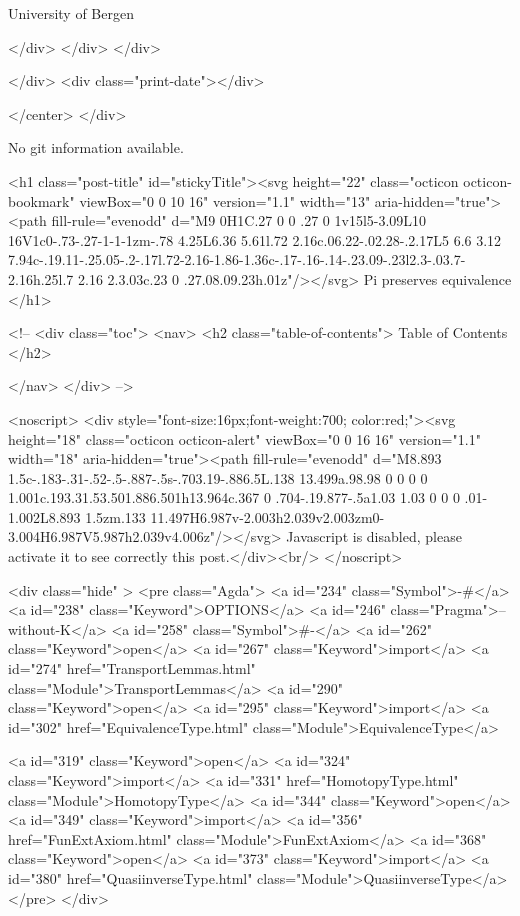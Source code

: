                   University of Bergen
                
                </div>
            </div>
          </div>
          
          
        </div>
        <div class="print-date"></div>
        
        
    </center>
  </div>

  
  No git information available.
  
  <h1 class="post-title" id="stickyTitle"><svg height="22" class="octicon octicon-bookmark" viewBox="0 0 10 16" version="1.1" width="13" aria-hidden="true"><path fill-rule="evenodd" d="M9 0H1C.27 0 0 .27 0 1v15l5-3.09L10 16V1c0-.73-.27-1-1-1zm-.78 4.25L6.36 5.61l.72 2.16c.06.22-.02.28-.2.17L5 6.6 3.12 7.94c-.19.11-.25.05-.2-.17l.72-2.16-1.86-1.36c-.17-.16-.14-.23.09-.23l2.3-.03.7-2.16h.25l.7 2.16 2.3.03c.23 0 .27.08.09.23h.01z"/></svg> Pi preserves equivalence
  </h1>

  <!-- 
  <div class="toc">
    <nav>
    <h2 class="table-of-contents"> Table of Contents </h2>
      

    </nav>
  </div>
   -->

  <noscript>
  <div style="font-size:16px;font-weight:700; color:red;"><svg height="18" class="octicon octicon-alert" viewBox="0 0 16 16" version="1.1" width="18" aria-hidden="true"><path fill-rule="evenodd" d="M8.893 1.5c-.183-.31-.52-.5-.887-.5s-.703.19-.886.5L.138 13.499a.98.98 0 0 0 0 1.001c.193.31.53.501.886.501h13.964c.367 0 .704-.19.877-.5a1.03 1.03 0 0 0 .01-1.002L8.893 1.5zm.133 11.497H6.987v-2.003h2.039v2.003zm0-3.004H6.987V5.987h2.039v4.006z"/></svg> Javascript is disabled, please activate it to see correctly this post.</div><br/>
  </noscript>

  <div class="hide" >
<pre class="Agda">
<a id="234" class="Symbol">{-#</a> <a id="238" class="Keyword">OPTIONS</a> <a id="246" class="Pragma">--without-K</a> <a id="258" class="Symbol">#-}</a>
<a id="262" class="Keyword">open</a> <a id="267" class="Keyword">import</a> <a id="274" href="TransportLemmas.html" class="Module">TransportLemmas</a>
<a id="290" class="Keyword">open</a> <a id="295" class="Keyword">import</a> <a id="302" href="EquivalenceType.html" class="Module">EquivalenceType</a>

<a id="319" class="Keyword">open</a> <a id="324" class="Keyword">import</a> <a id="331" href="HomotopyType.html" class="Module">HomotopyType</a>
<a id="344" class="Keyword">open</a> <a id="349" class="Keyword">import</a> <a id="356" href="FunExtAxiom.html" class="Module">FunExtAxiom</a>
<a id="368" class="Keyword">open</a> <a id="373" class="Keyword">import</a> <a id="380" href="QuasiinverseType.html" class="Module">QuasiinverseType</a>
</pre>
</div>


